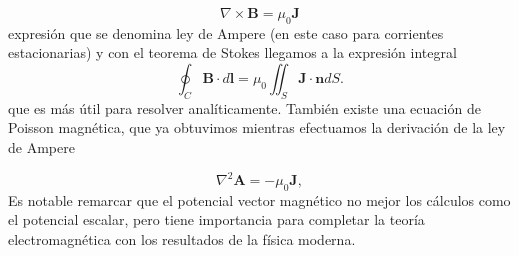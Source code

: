 \documentclass[11pt,a4paper]{article}
\numberwithin{equation}{section}
\begin{document}
\begin{equation}
    \nabla \times \textbf{B} = \mu_0 \textbf{J}
    \label{eq:m_ampere_dif}
\end{equation}
expresión que se denomina ley de Ampere (en este caso para corrientes estacionarias) y con el teorema de Stokes llegamos a la expresión integral
\begin{equation}
    \oint_{C} \textbf{B} \cdot d\textbf{l} = \mu_0 \iint_{S} \textbf{J} \cdot \textbf{n} dS.
    \label{eq:m_ampere_int}
\end{equation}
que es más útil para resolver analíticamente. También existe una ecuación de Poisson magnética, que ya obtuvimos mientras efectuamos la derivación de la ley de Ampere

\begin{equation}
    \nabla^2\textbf{A} = -\mu_0 \textbf{J},
    \label{eq:m_poisson}
\end{equation}
Es notable remarcar que el potencial vector magnético no mejor los cálculos como el potencial escalar, pero tiene importancia para completar la teoría electromagnética con los resultados de la física moderna.
\end{document}

